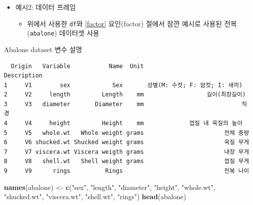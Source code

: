 \documentclass[
  11pt,
]{krantz}
\newenvironment{Shaded}{\begin{snugshade}}{\end{snugshade}}
\newcommand{\KeywordTok}[1]{\textcolor[rgb]{0.27,0.27,0.27}{\textbf{#1}}}
\newcommand{\NormalTok}[1]{#1}
\newcommand{\StringTok}[1]{\textcolor[rgb]{0.5,0.5,0.5}{#1}}
\providecommand{\tightlist}{%
  \setlength{\itemsep}{0pt}\setlength{\parskip}{0pt}}
\let\BeginKnitrBlock\begin \let\EndKnitrBlock\end
\begin{document}
\normalsize

\begin{itemize}
\tightlist
\item
  예시2: 데이터 프레임

  \begin{itemize}
  \tightlist
  \item
    위에서 사용한 \texttt{df}와 \ref{factor} 요인(factor) 절에서 잠깐 예시로 사용된 전복(\texttt{abalone}) 데이터셋 사용
  \end{itemize}
\end{itemize}

\footnotesize

\BeginKnitrBlock{rmdnote}
Abalone dataset 변수 설명
\EndKnitrBlock{rmdnote}

\normalsize

\footnotesize

\begin{verbatim}
  Origin   Variable           Name  Unit                     Description
1     V1        sex            Sex       성별(M: 수컷; F: 암컷; I: 새끼)
2     V2     length         Length    mm                  길이(최장길이)
3     V3   diameter       Diameter    mm                            직경
4     V4     height         Height    mm             껍질 내 육질의 높이
5     V5   whole.wt   Whole weight grams                       전체 중량
6     V6 shucked.wt Shucked weight grams                       육질 무게
7     V7 viscera.wt Viscera weigth grams                       내장 무게
8     V8   shell.wt   Shell weight grams                       껍질 무게
9     V9      rings          Rings                             전복 나이
\end{verbatim}

\normalsize

\footnotesize

\begin{Shaded}
\begin{Highlighting}[]
\KeywordTok{names}\NormalTok{(abalone) <-}\StringTok{ }\KeywordTok{c}\NormalTok{(}\StringTok{"sex"}\NormalTok{, }\StringTok{"length"}\NormalTok{, }\StringTok{"diameter"}\NormalTok{, }
                    \StringTok{"height"}\NormalTok{, }\StringTok{"whole.wt"}\NormalTok{, }
                    \StringTok{"shucked.wt"}\NormalTok{, }\StringTok{"viscera.wt"}\NormalTok{, }
                    \StringTok{"shell.wt"}\NormalTok{, }\StringTok{"rings"}\NormalTok{)}
\KeywordTok{head}\NormalTok{(abalone)}
\end{Highlighting}
\end{Shaded}
\end{document}
